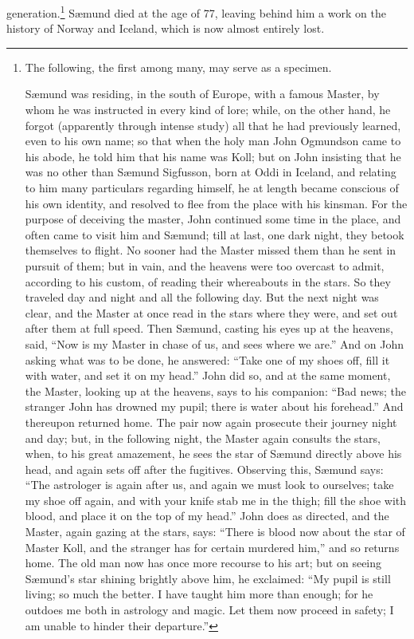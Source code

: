 generation.\footnote{The following, the first among many, may serve as a
specimen.

Sæmund was residing, in the south of Europe, with a famous Master, by
whom he was instructed in every kind of lore; while, on the other
hand, he forgot (apparently through intense study) all that he had
previously learned, even to his own name; so that when the holy man
John Ogmundson came to his abode, he told him that his name was Koll;
but on John insisting that he was no other than Sæmund Sigfusson, born
at Oddi in Iceland, and relating to him many particulars regarding
himself, he at length became conscious of his own identity, and
resolved to flee from the place with his kinsman. For the purpose of
deceiving the master, John continued some time in the place, and often
came to visit him and Sæmund; till at last, one dark night, they
betook themselves to flight. No sooner had the Master missed them than
he sent in pursuit of them; but in vain, and the heavens were too
overcast to admit, according to his custom, of reading their
whereabouts in the stars. So they traveled day and night and all the
following day. But the next night was clear, and the Master at once
read in the stars where they were, and set out after them at full
speed. Then Sæmund, casting his eyes up at the heavens, said, ``Now is
my Master in chase of us, and sees where we are.'' And on John asking
what was to be done, he answered: ``Take one of my shoes off, fill it
with water, and set it on my head.'' John did so, and at the same
moment, the Master, looking up at the heavens, says to his companion:
``Bad news; the stranger John has drowned my pupil; there is water
about his forehead.'' And thereupon returned home. The pair now again
prosecute their journey night and day; but, in the following night,
the Master again consults the stars, when, to his great amazement, he
sees the star of Sæmund directly above his head, and again sets off
after the fugitives. Observing this, Sæmund says: ``The astrologer is
again after us, and again we must look to ourselves; take my shoe off
again, and with your knife stab me in the thigh; fill the shoe with
blood, and place it on the top of my head.'' John does as directed, and
the Master, again gazing at the stars, says: ``There is blood now about
the star of Master Koll, and the stranger has for certain murdered
him,'' and so returns home. The old man now has once more recourse to
his art; but on seeing Sæmund's star shining brightly above him, he
exclaimed: ``My pupil is still living; so much the better. I have
taught him more than enough; for he outdoes me both in astrology and
magic. Let them now proceed in safety; I am unable to hinder their
departure.''} Sæmund died at the age of 77, leaving behind him a work
on the history of Norway and Iceland, which is now almost entirely
lost.

